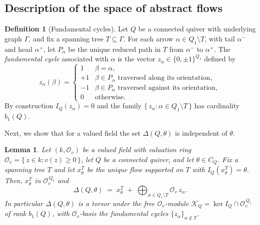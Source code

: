 \documentclass[12pt]{amsart}
\theoremstyle{plain}
\newtheorem{lemma}[theorem]{Lemma}
\theoremstyle{definition}
\newtheorem{definition}[theorem]{Definition}
\begin{document}
\subsection{Description of the space of abstract flows}
\begin{definition}[Fundamental cycles]
Let $Q$ be a connected quiver with underlying graph $\Gamma$, and fix a
spanning tree $T \subseteq \Gamma$. For each arrow
$\alpha \in Q_1 \setminus T$, with tail $\alpha^{-}$ and head $\alpha^+$, let
$P_\alpha$ be the unique reduced path in $T$ from $\alpha^-$ to $\alpha^+$.
The \emph{fundamental cycle} associated with $\alpha$ is the vector
$z_\alpha \in \{0,\pm 1\}^{Q_1}$ defined by
\[
  z_\alpha(\beta) =
  \begin{cases}
    1 & \beta = \alpha,\\
    +1 & \beta \in P_\alpha \text{ traversed along its orientation},\\
    -1 & \beta \in P_\alpha \text{ traversed against its orientation},\\
    0 & \text{otherwise.}
  \end{cases}
\]
By construction $I_Q(z_\alpha) = 0$ and the family
$\{\, z_\alpha : \alpha \in Q_1 \setminus T \,\}$ has cardinality
$b_1(Q)$.
\end{definition}

Next, we show that for a valued field the set $\Delta(Q,\theta)$ is independent of $\theta$.
\begin{lemma}
Let $(k, \mathcal{O}_v)$ be a valued field with valuation ring
$\mathcal{O}_v = \{\, z \in k : v(z) \ge 0 \,\}$, let $Q$ be a connected quiver,
and let $\theta \in C_Q$. Fix a spanning tree $T$ and let $x^T_\theta$ be the
unique flow  supported on $T$ with $I_Q(x^T_\theta) = \theta$. Then, $x^T_\theta$ in $ \mathcal{O}_v^{\,Q_1}$ and
\[
  \Delta(Q,\theta)
  \;=\; x^T_\theta \;+\; \bigoplus_{\alpha \in Q_1 \setminus T}
        \mathcal{O}_v\, z_\alpha .
\]
In particular $\Delta(Q,\theta)$ is a torsor under the free $\mathcal{O}_v$-module
$\mathcal{K}_Q = \ker I_Q \cap \mathcal{O}_v^{\,Q_1}$ of rank $b_1(Q)$, with
$\mathcal{O}_v$-basis the fundamental cycles $\{z_\alpha\}_{\alpha \notin T}$.
\end{lemma}
\end{document}

